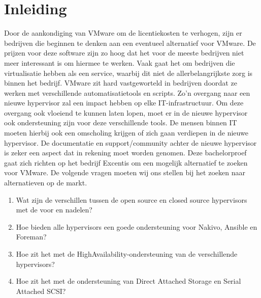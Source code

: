 


% 

\section{Inleiding}%
\label{sec:inleiding}

Door de aankondiging van VMware om de licentiekosten te verhogen, zijn er bedrijven die beginnen te denken aan een eventueel alternatief voor VMware.
De prijzen voor deze software zijn zo hoog dat het voor de meeste bedrijven niet meer interessant is om hiermee te werken.
Vaak gaat het om bedrijven die virtualisatie hebben als een service, waarbij dit niet de allerbelangrijkste zorg is binnen het bedrijf.
VMware zit hard vastgeworteld in bedrijven doordat ze werken met verschillende automatisatietools en scripts. Zo'n overgang naar een nieuwe hypervisor zal een impact hebben op elke IT-infrastructuur.
Om deze overgang ook vloeiend te kunnen laten lopen, moet er in de nieuwe hypervisor ook ondersteuning zijn voor deze verschillende tools.
De mensen binnen IT moeten hierbij ook een omscholing krijgen of zich gaan verdiepen in de nieuwe hypervisor. De documentatie en support/community achter de nieuwe hypervisor is zeker een aspect dat in rekening moet worden genomen.
Deze bachelorproef gaat zich richten op het bedrijf Excentis om een mogelijk alternatief te zoeken voor VMware.
De volgende vragen moeten wij ons stellen bij het zoeken naar alternatieven op de markt.
\begin{enumerate}
\item Wat zijn de verschillen tussen de open source en closed source hypervisors met de voor en nadelen?
\item Hoe bieden alle hypervisors een goede ondersteuning voor Nakivo, Ansible en Foreman?\newline
\item Hoe zit het met de HighAvailability-ondersteuning van de verschillende hypervisors?
\item Hoe zit het met de ondersteuning van Direct Attached Storage en Serial Attached SCSI?
\end{enumerate}



